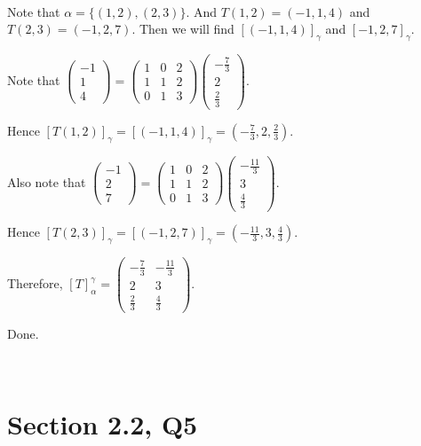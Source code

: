 \documentclass[12pt]{article}%
\begin{document}
~\ 

Note that $\alpha=\{(1,2),(2,3)\}.$ And $T(1,2)=(-1,1,4)$ and $T(2,3)=(-1,2,7).$ Then we will find $[(-1,1,4)]_\gamma$ and $[-1,2,7]_\gamma.$

Note that $\begin{pmatrix}-1\\1\\4 \end{pmatrix}=\begin{pmatrix}1 & 0 & 2\\1 & 1& 2\\0&1&3\end{pmatrix} \begin{pmatrix} -\frac{7}{3}\\2\\\frac{2}{3} \end{pmatrix}.$

Hence $[T(1,2)]_\gamma = [(-1,1,4)]_\gamma = (-\frac{7}{3},2,\frac{2}{3}).$

Also note that $\begin{pmatrix}-1\\2\\7 \end{pmatrix}=\begin{pmatrix}1 & 0 & 2\\1 & 1& 2\\0&1&3\end{pmatrix} \begin{pmatrix} -\frac{11}{3}\\3\\\frac{4}{3} \end{pmatrix}.$ 

Hence $[T(2,3)]_\gamma = [(-1,2,7)]_\gamma = (-\frac{11}{3},3,\frac{4}{3}).$

Therefore, $[T]_\alpha^{\gamma}=\begin{pmatrix}-\frac{7}{3} & -\frac{11}{3} \\2 & 3\\\frac{2}{3} &\frac{4}{3}\end{pmatrix}.$ 

Done.

~\ 

\section{Section 2.2, Q5}
\end{document}
